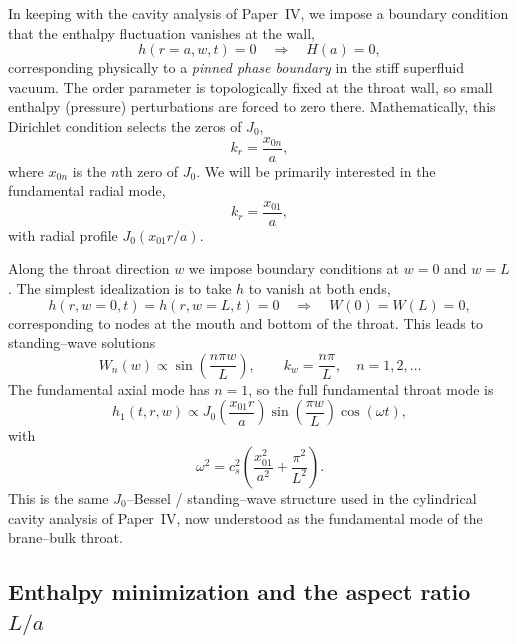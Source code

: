 \documentclass[12pt]{article}
\begin{document}
In keeping with the cavity analysis of Paper~IV, we impose a boundary
condition that the enthalpy fluctuation vanishes at the wall,
\begin{equation}
  h(r=a,w,t) = 0 \quad\Rightarrow\quad H(a) = 0,
\end{equation}
corresponding physically to a \emph{pinned phase boundary} in the stiff
superfluid vacuum.  The order parameter is topologically fixed at the throat
wall, so small enthalpy (pressure) perturbations are forced to zero there.
Mathematically, this Dirichlet condition selects the zeros of $J_0$,
\begin{equation}
  k_r = \frac{x_{0n}}{a},
\end{equation}
where $x_{0n}$ is the $n$th zero of $J_0$.  We will be primarily interested
in the fundamental radial mode,
\begin{equation}
  k_r = \frac{x_{01}}{a},
\end{equation}
with radial profile $J_0(x_{01}r/a)$.

Along the throat direction $w$ we impose boundary conditions at $w=0$ and
$w=L$.  The simplest idealization is to take $h$ to vanish at both ends,
\begin{equation}
  h(r,w=0,t) = h(r,w=L,t) = 0 \quad\Rightarrow\quad W(0)=W(L)=0,
\end{equation}
corresponding to nodes at the mouth and bottom of the throat.  This leads to
standing--wave solutions
\begin{equation}
  W_n(w) \propto \sin\!\left(\frac{n\pi w}{L}\right),
  \qquad
  k_w = \frac{n\pi}{L},
  \quad n=1,2,\dots
\end{equation}
The fundamental axial mode has $n=1$, so the full fundamental throat mode is
\begin{equation}
  h_1(t,r,w)
  \propto J_0\!\left(\frac{x_{01} r}{a}\right)
          \sin\!\left(\frac{\pi w}{L}\right)
          \cos(\omega t),
  \label{eq:fundamental_mode}
\end{equation}
with
\begin{equation}
  \omega^2
  = c_s^2\left(
      \frac{x_{01}^2}{a^2}
      + \frac{\pi^2}{L^2}
    \right).
  \label{eq:fundamental_dispersion}
\end{equation}
This is the same $J_0$--Bessel / standing--wave structure used in the
cylindrical cavity analysis of Paper~IV, now understood as the fundamental
mode of the brane--bulk throat.

\subsection{Enthalpy minimization and the aspect ratio \texorpdfstring{$L/a$}{L/a}}
\label{subsec:aspect_ratio}
\end{document}
